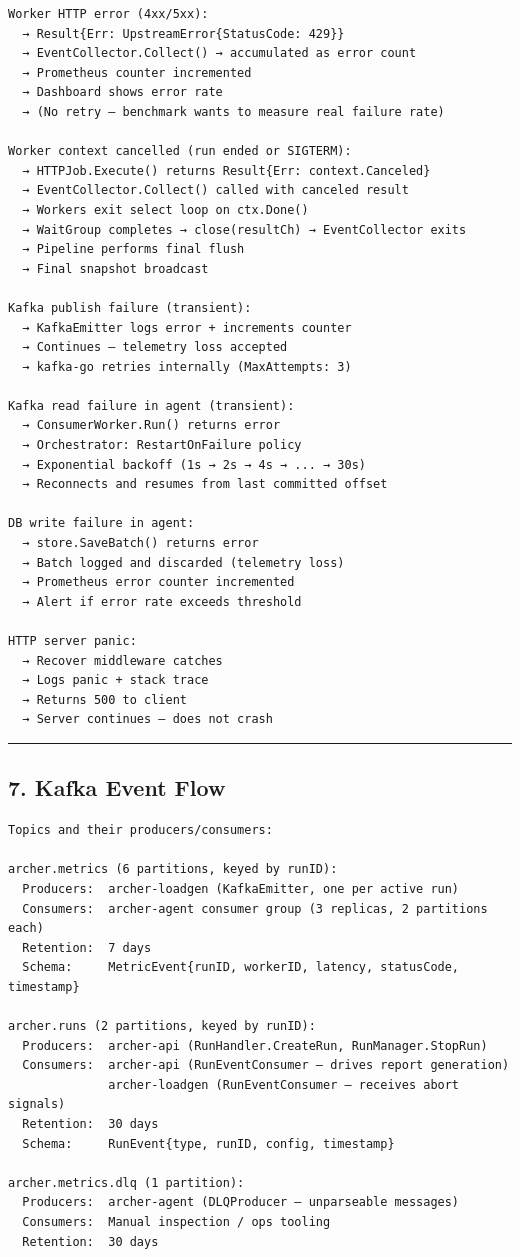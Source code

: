 \documentclass[
]{article}
\begin{document}
\begin{verbatim}
Worker HTTP error (4xx/5xx):
  → Result{Err: UpstreamError{StatusCode: 429}}
  → EventCollector.Collect() → accumulated as error count
  → Prometheus counter incremented
  → Dashboard shows error rate
  → (No retry — benchmark wants to measure real failure rate)

Worker context cancelled (run ended or SIGTERM):
  → HTTPJob.Execute() returns Result{Err: context.Canceled}
  → EventCollector.Collect() called with canceled result
  → Workers exit select loop on ctx.Done()
  → WaitGroup completes → close(resultCh) → EventCollector exits
  → Pipeline performs final flush
  → Final snapshot broadcast

Kafka publish failure (transient):
  → KafkaEmitter logs error + increments counter
  → Continues — telemetry loss accepted
  → kafka-go retries internally (MaxAttempts: 3)

Kafka read failure in agent (transient):
  → ConsumerWorker.Run() returns error
  → Orchestrator: RestartOnFailure policy
  → Exponential backoff (1s → 2s → 4s → ... → 30s)
  → Reconnects and resumes from last committed offset

DB write failure in agent:
  → store.SaveBatch() returns error
  → Batch logged and discarded (telemetry loss)
  → Prometheus error counter incremented
  → Alert if error rate exceeds threshold

HTTP server panic:
  → Recover middleware catches
  → Logs panic + stack trace
  → Returns 500 to client
  → Server continues — does not crash
\end{verbatim}

\begin{center}\rule{0.5\linewidth}{0.5pt}\end{center}

\hypertarget{kafka-event-flow}{%
\subsection{7. Kafka Event Flow}\label{kafka-event-flow}}

\begin{verbatim}
Topics and their producers/consumers:

archer.metrics (6 partitions, keyed by runID):
  Producers:  archer-loadgen (KafkaEmitter, one per active run)
  Consumers:  archer-agent consumer group (3 replicas, 2 partitions each)
  Retention:  7 days
  Schema:     MetricEvent{runID, workerID, latency, statusCode, timestamp}

archer.runs (2 partitions, keyed by runID):
  Producers:  archer-api (RunHandler.CreateRun, RunManager.StopRun)
  Consumers:  archer-api (RunEventConsumer — drives report generation)
              archer-loadgen (RunEventConsumer — receives abort signals)
  Retention:  30 days
  Schema:     RunEvent{type, runID, config, timestamp}

archer.metrics.dlq (1 partition):
  Producers:  archer-agent (DLQProducer — unparseable messages)
  Consumers:  Manual inspection / ops tooling
  Retention:  30 days
\end{verbatim}
\end{document}

